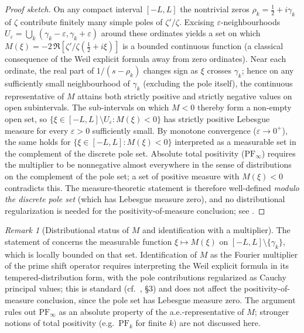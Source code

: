 \documentclass[12pt,a4paper]{article}
\theoremstyle{definition}
\theoremstyle{remark}
\newtheorem{remark}[theorem]{Remark}
\begin{document}
\begin{proof}[Proof sketch]
On any compact interval $[-L,L]$ the nontrivial zeros $\rho_k = \tfrac{1}{2}+i\gamma_k$ of $\zeta$ contribute finitely many simple poles of $\zeta'/\zeta$. Excising $\varepsilon$-neighbourhoods $U_\varepsilon = \bigcup_k (\gamma_k - \varepsilon, \gamma_k + \varepsilon)$ around these ordinates yields a set on which $M(\xi) = -2\,\Re[\zeta'/\zeta(\tfrac{1}{2}+i\xi)]$ is a bounded continuous function (a classical consequence of the Weil explicit formula away from zero ordinates). Near each ordinate, the real part of $1/(s-\rho_k)$ changes sign as $\xi$ crosses $\gamma_k$; hence on any sufficiently small neighbourhood of $\gamma_k$ (excluding the pole itself), the continuous representative of $M$ attains both strictly positive and strictly negative values on open subintervals. The sub-intervals on which $M < 0$ thereby form a non-empty open set, so $\{\xi \in [-L,L]\setminus U_\varepsilon : M(\xi) < 0\}$ has strictly positive Lebesgue measure for every $\varepsilon > 0$ sufficiently small. By monotone convergence ($\varepsilon \to 0^+$), the same holds for $\{\xi \in [-L,L] : M(\xi) < 0\}$ interpreted as a measurable set in the complement of the discrete pole set. Absolute total positivity ($\mathrm{PF}_\infty$) requires the multiplier to be nonnegative almost everywhere in the sense of distributions on the complement of the pole set; a set of positive measure with $M(\xi) < 0$ contradicts this. The measure-theoretic statement is therefore well-defined \emph{modulo the discrete pole set} (which has Lebesgue measure zero), and no distributional regularization is needed for the positivity-of-measure conclusion; see .
\end{proof}

\begin{remark}[Distributional status of $M$ and identification with a multiplier]
\label{rem:NE-A-distribution}
The statement of  concerns the measurable function $\xi \mapsto M(\xi)$ on $[-L,L] \setminus \{\gamma_k\}$, which is locally bounded on that set. Identification of $M$ as the Fourier multiplier of the prime shift operator requires interpreting the Weil explicit formula in its tempered-distribution form, with the pole contributions regularized as Cauchy principal values; this is standard (cf.~\cite{Connes2026}, \S3) and does not affect the positivity-of-measure conclusion, since the pole set has Lebesgue measure zero. The argument rules out $\mathrm{PF}_\infty$ as an absolute property of the a.e.-representative of $M$; stronger notions of total positivity (e.g.\ $\mathrm{PF}_k$ for finite $k$) are not discussed here.
\end{remark}
\end{document}
